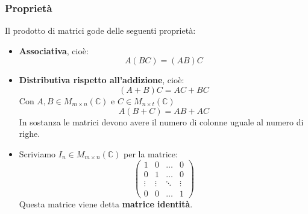 \documentclass[a4paper]{article}
\theoremstyle{break}
\theoremstyle{break}
\theoremstyle{break}
\theoremstyle{break}
\begin{document}
\subsubsection{Proprietà}
Il prodotto di matrici gode delle seguenti proprietà:
\begin{itemize}
  \item \textbf{Associativa}, cioè:
    \[
      A(BC) = (AB)C
    \] 
  \item \textbf{Distributiva rispetto all'addizione}, cioè:
    \[
      (A+B)C = AC + BC
    \] 
    Con \( A,B \in M_{m \times n}(\mathbb{C}) \) e \( C \in M_{n \times t}(\mathbb{C}) \)
    \[
      A(B+C) = AB + AC
    \] 
    In sostanza le matrici devono avere il numero di colonne uguale al numero di righe.
  \item Scriviamo \( I_n \in M_{m \times n}(\mathbb{C}) \) per la matrice:
    \[
      \begin{pmatrix} 
        1 & 0 & \ldots & 0\\
        0 & 1 & \ldots & 0\\
        \vdots & \vdots & \ddots & \vdots\\
        0 & 0 & \ldots & 1
      \end{pmatrix}
    \] 
    Questa matrice viene detta \textbf{matrice identità}.


\end{itemize}
\end{document}
